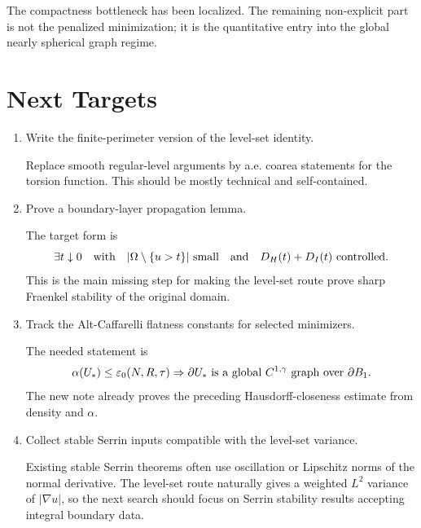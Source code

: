 \documentclass[11pt]{article}
\begin{document}
The compactness bottleneck has been localized. The remaining non-explicit part
is not the penalized minimization; it is the quantitative entry into the global
nearly spherical graph regime.

\section{Next Targets}

\begin{enumerate}
\item Write the finite-perimeter version of the level-set identity.

Replace smooth regular-level arguments by a.e. coarea statements for the
torsion function. This should be mostly technical and self-contained.

\item Prove a boundary-layer propagation lemma.

The target form is
\[
\exists t\downarrow0
\quad\hbox{with}\quad
|\Omega\setminus\{u>t\}|\hbox{ small}
\quad\hbox{and}\quad
D_H(t)+D_I(t)\hbox{ controlled}.
\]
This is the main missing step for making the level-set route prove sharp
Fraenkel stability of the original domain.

\item Track the Alt-Caffarelli flatness constants for selected minimizers.

The needed statement is
\[
\alpha(U_*)\le\varepsilon_0(N,R,\tau)
\Rightarrow
\partial U_*
\hbox{ is a global }C^{1,\gamma}\hbox{ graph over }\partial B_1.
\]
The new note already proves the preceding Hausdorff-closeness estimate from
density and \(\alpha\).

\item Collect stable Serrin inputs compatible with the level-set variance.

Existing stable Serrin theorems often use oscillation or Lipschitz norms of the
normal derivative. The level-set route naturally gives a weighted \(L^2\)
variance of \(|\nabla u|\), so the next search should focus on Serrin stability
results accepting integral boundary data.
\end{enumerate}
\end{document}
